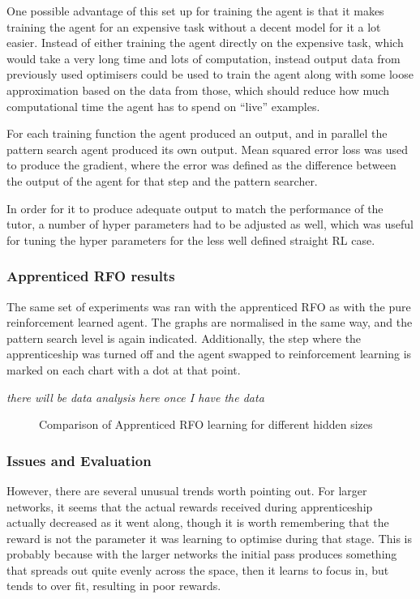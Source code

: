 One possible advantage of this set up for training the agent is that it makes training the agent for an expensive task without a decent model for it a lot easier. Instead of either training the agent directly on the expensive task, which would take a very long time and lots of computation, instead output data from previously used optimisers could be used to train the agent along with some loose approximation based on the data from those, which should reduce how much computational time the agent has to spend on ``live'' examples.

For each training function the agent produced an output, and in parallel the pattern search agent produced its own output. Mean squared error loss was used to produce the gradient, where the error was defined as the difference between the output of the agent for that step and the pattern searcher.

In order for it to produce adequate output to match the performance of the tutor, a number of hyper parameters had to be adjusted as well, which was useful for tuning the hyper parameters for the less well defined straight RL case.

\subsubsection{Apprenticed RFO results}
The same set of experiments was ran with the apprenticed RFO as with the pure reinforcement learned agent. %
The graphs are normalised in the same way, and the pattern search level is again indicated. Additionally, the step where the apprenticeship was turned off and the agent swapped to reinforcement learning is marked on each chart with a dot at that point.

\emph{there will be data analysis here once I have the data}
\begin{figure}
\centering

\caption{Comparison of Apprenticed RFO learning for different hidden sizes}
\label{fig:exp1apprfo}
\end{figure}

%
%

\subsubsection{Issues and Evaluation}
 However, there are several unusual trends worth pointing out. For larger networks, it seems that the actual rewards received during apprenticeship actually decreased as it went along, though it is worth remembering that the reward is not the parameter it was learning to optimise during that stage. This is probably because with the larger networks the initial pass produces something that spreads out quite evenly across the space, then it learns to focus in, but tends to over fit, resulting in poor rewards.


